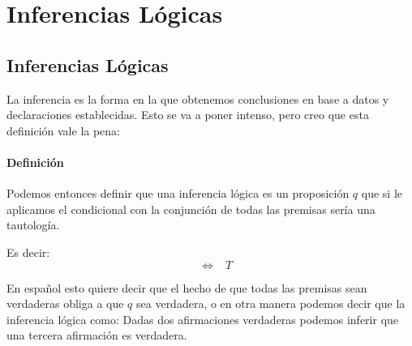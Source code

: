 \documentclass[12pt, fleqn]{report}                             %
\DeclareMathOperator \Space     {\quad}                         %
\DeclareMathOperator \MiniSpace {\;}                            %
\theoremstyle{break}                                            %
\newcommand \lEqual  {\MiniSpace \Leftrightarrow \MiniSpace}    %
\begin{document}
    \clearpage
    \chapter{Inferencias Lógicas}
        \clearpage

        
        \section{Inferencias Lógicas}

            La inferencia es la forma en la que obtenemos conclusiones en base a datos y declaraciones establecidas.
            Esto se va a poner intenso, pero creo que esta definición vale la pena:

            \subsubsection{Definición}

                Podemos entonces definir que una inferencia lógica es un proposición $q$ que si le aplicamos
                el condicional con la conjunción de todas las premisas sería una tautología.

                Es decir:
                \begin{equation*}
                    [p_1 \land p_2 \land p_3 \dots \to q] \lEqual T
                \end{equation*}

                En español esto quiere decir que el hecho de que todas las premisas sean verdaderas obliga a
                que $q$ sea verdadera, o en otra manera podemos decir que la inferencia lógica como: 
                Dadas dos afirmaciones verdaderas podemos inferir que una tercera afirmación es verdadera.


\end{document}
